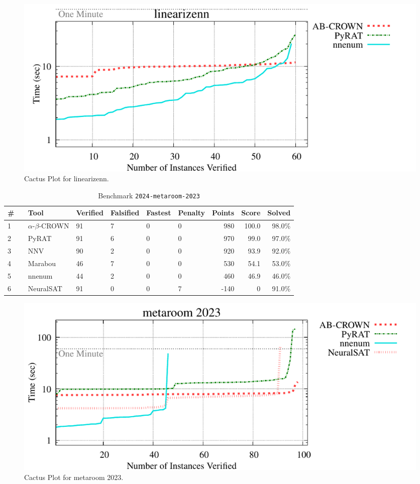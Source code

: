 \begin{figure}[h]
\centerline{\includegraphics[width=\textwidth]{cactus/2024_linearizenn.pdf}}
\caption{Cactus Plot for linearizenn.}
\label{fig:quantPic}
\end{figure}


\clearpage

\begin{table}[h]
\begin{center}
\caption{Benchmark \texttt{2024-metaroom-2023}} \label{tab:cat_{cat}}
{\setlength{\tabcolsep}{2pt}
\begin{tabular}[h]{@{}llllllrrr@{}}
\toprule
\textbf{\# ~} & \textbf{Tool} & \textbf{Verified} & \textbf{Falsified} & \textbf{Fastest} & \textbf{Penalty} & \textbf{Points} & \textbf{Score} & \textbf{Solved}\\
\midrule
1 & $\alpha$-$\beta$-CROWN & 91 & 7 & 0 & 0 & 980 & 100.0 & 98.0\% \\
2 & PyRAT & 91 & 6 & 0 & 0 & 970 & 99.0 & 97.0\% \\
3 & NNV & 90 & 2 & 0 & 0 & 920 & 93.9 & 92.0\% \\
4 & Marabou & 46 & 7 & 0 & 0 & 530 & 54.1 & 53.0\% \\
5 & nnenum & 44 & 2 & 0 & 0 & 460 & 46.9 & 46.0\% \\
6 & NeuralSAT & 91 & 0 & 0 & 7 & -140 & 0 & 91.0\% \\
\bottomrule
\end{tabular}
}
\end{center}
\end{table}



\begin{figure}[h]
\centerline{\includegraphics[width=\textwidth]{cactus/2024_metaroom_2023.pdf}}
\caption{Cactus Plot for metaroom 2023.}
\label{fig:quantPic}
\end{figure}


